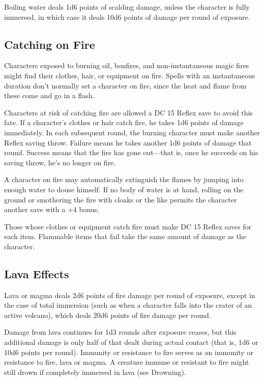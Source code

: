 Boiling water deals 1d6 points of scalding damage, unless the character is fully immersed, in which case it deals 10d6 points of damage per round of exposure.
				
\subsection{Catching on Fire}

				
Characters exposed to burning oil, bonfires, and non-instantaneous magic fires might find their clothes, hair, or equipment on fire. Spells with an instantaneous duration don't normally set a character on fire, since the heat and flame from these come and go in a flash.
				
Characters at risk of catching fire are allowed a DC 15 Reflex save to avoid this fate. If a character's clothes or hair catch fire, he takes 1d6 points of damage immediately. In each subsequent round, the burning character must make another Reflex saving throw. Failure means he takes another 1d6 points of damage that round. Success means that the fire has gone out---that is, once he succeeds on his saving throw, he's no longer on fire.
				
A character on fire may automatically extinguish the flames by jumping into enough water to douse himself. If no body of water is at hand, rolling on the ground or smothering the fire with cloaks or the like permits the character another save with a +4 bonus.
				
Those whose clothes or equipment catch fire must make DC 15 Reflex saves for each item. Flammable items that fail take the same amount of damage as the character.
				
\subsection{Lava Effects}

				
Lava or magma deals 2d6 points of fire damage per round of exposure, except in the case of total immersion (such as when a character falls into the crater of an active volcano), which deals 20d6 points of fire damage per round.
				
Damage from lava continues for 1d3 rounds after exposure ceases, but this additional damage is only half of that dealt during actual contact (that is, 1d6 or 10d6 points per round). Immunity or resistance to fire serves as an immunity or resistance to fire, lava or magma. A creature immune or resistant to fire might still drown if completely immersed in lava (see Drowning).
				
